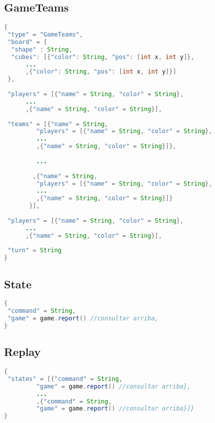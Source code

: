 \documentclass{article}
\begin{document}
\subsection*{GameTeams}
\begin{lstlisting}[frame=single, language=Java]
{
 "type" = "GameTeams",
 "board" = {
  "shape" : String,
  "cubes": [{"color": String, "pos": [int x, int y]},
  	  ...
  	  ,{"color": String, "pos": [int x, int y]}]
 },
 
 "players" = [{"name" = String, "color" = String},
 	  ...
 	  ,{"name" = String, "color" = String}],
 
 "teams" = [{"name" = String,
 	     "players" = [{"name" = String, "color" = String},
 	     ...
 	     ,{"name" = String, "color" = String}]},
 	     
 	     ...
 	     
 	    ,{"name" = String,
 	     "players" = [{"name" = String, "color" = String},
 	     ...
 	     ,{"name" = String, "color" = String}]}
	   }],
	   
 "players" = [{"name" = String, "color" = String},
 	  ...
 	  ,{"name" = String, "color" = String}],
 
 "turn" = String	
}
\end{lstlisting}

\newpage

\subsection*{State}
\begin{lstlisting}[frame=single, language=Java]
{
 "command" = String,
 "game" = game.report() //consultar arriba,
}
\end{lstlisting}

\subsection*{Replay}
\begin{lstlisting}[frame=single, language=Java]
{
 "states" = [{"command" = String,
 	     "game" = game.report() //consultar arriba},
 	     ...
 	     ,{"command" = String,
 	     "game" = game.report() //consultar arriba}]}
}
\end{lstlisting}
\end{document}
